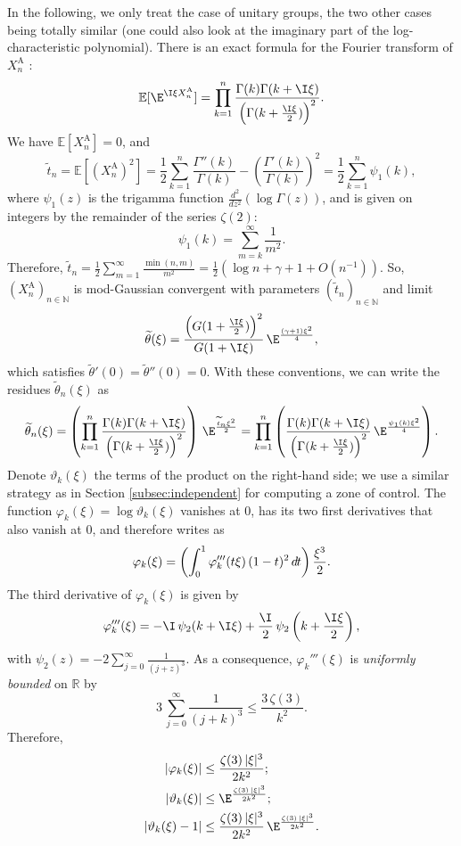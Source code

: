 \documentclass[envcountsame]{svmult}
\newcommand{\N}{\mathbb{N}}
\newcommand{\R}{\mathbb{R}}
\newcommand{\esper}{\mathbb{E}}
\newcommand{\DD}[1]{\,d\hspace*{-0.3mm}{#1}}
\begin{document}
In the following, we only treat the case of unitary groups, the two other cases being totally similar (one could also look at the imaginary part of the log-characteristic polynomial). There is an exact formula for the Fourier transform of $X_n^\mathrm{A}$ \cite[Formula (71)]{KS2000}:
$$\esper[\E^{\I \xi X_n^{\mathrm{A}}}] = \prod_{k=1}^n \frac{\Gamma(k)\Gamma(k+\I \xi)}{\left(\Gamma(k+\frac{\I\xi}{2})\right)^2}.$$
We have $\esper[X_n^{\mathrm{A}}]=0$, and 
$$\widetilde{t}_n=\esper[(X_n^{\mathrm{A}})^2]=\frac{1}{2}\sum_{k=1}^n \frac{\Gamma''(k)}{\Gamma(k)} - \left(\frac{\Gamma'(k)}{\Gamma(k)}\right)^2 = \frac{1}{2}\sum_{k=1}^n \psi_1(k),$$
where $\psi_1(z)$ is the trigamma function $\frac{d^2}{dz^2}(\log\Gamma(z))$, and is given on integers by the remainder of the series $\zeta(2)$:
$$\psi_1(k) = \sum_{m=k}^\infty \frac{1}{m^2}.$$
Therefore, $\widetilde{t}_n = \frac{1}{2}\sum_{m=1}^\infty \frac{\min(n,m)}{m^2} = \frac{1}{2}(\log n + \gamma + 1 + O(n^{-1}))$. So, $(X_n^\mathrm{A})_{n \in \N}$ is mod-Gaussian convergent with parameters $(\widetilde{t}_n)_{n \in \N}$ and limit
$$\widetilde{\theta}(\xi) = \frac{\left(G(1+\frac{\I \xi}{2})\right)^2}{G(1+\I \xi)}\,\E^{\frac{(\gamma+1)\xi^2}{4}},$$
which satisfies $\widetilde{\theta}'(0)=\widetilde{\theta}''(0)=0$. With these conventions, we can write the residues $\widetilde{\theta}_n(\xi)$ as
$$\widetilde{\theta}_n(\xi)= \left(\prod_{k=1}^n \frac{\Gamma(k)\Gamma(k+\I \xi)}{\left(\Gamma(k+\frac{\I\xi}{2})\right)^2}\right)\,\E^{\frac{\widetilde{t}_n\xi^2}{2}} = \prod_{k=1}^n \left(\frac{\Gamma(k)\Gamma(k+\I \xi)}{\left(\Gamma(k+\frac{\I\xi}{2})\right)^2}\,\E^{\frac{\psi_1(k)\xi^2}{4}}\right).$$
Denote $\vartheta_k(\xi)$ the terms of the product on the right-hand side; we use a similar strategy as in Section \ref{subsec:independent} for computing a zone of control. The function $\varphi_k(\xi) = \log \vartheta_k(\xi)$ vanishes at $0$, has its two first derivatives that also vanish at $0$, and therefore writes as
$$\varphi_k(\xi) = \left(\int_0^1 \varphi_k'''(t\xi)\, (1-t)^2\DD{t}\right)\frac{\xi^3}{2}.$$
The third derivative of $\varphi_k(\xi)$ is given by
$$\varphi_k'''(\xi) = -\I \,\psi_2(k+\I\xi) + \frac{\I}{2}\,\psi_2\left(k+\frac{\I\xi}{2}\right),$$
with $\psi_2(z) = -2\sum_{j=0}^\infty \frac{1}{(j+z)^3}$. As a consequence, $\varphi_k'''(\xi)$ is \emph{uniformly bounded} on $\R$ by
$$3\,\sum_{j=0}^\infty \frac{1}{(j+k)^3} \leq \frac{3\,\zeta(3)}{k^2}.$$
Therefore, 
\begin{align*}
|\varphi_k(\xi)| &\leq \frac{\zeta(3)\, |\xi|^3}{2k^2};\\
|\vartheta_k(\xi)| &\leq \E^{\frac{\zeta(3)\, |\xi|^3}{2k^2}};\\
|\vartheta_k(\xi)-1| &\leq \frac{\zeta(3)\, |\xi|^3}{2k^2}\,\E^{\frac{\zeta(3)\, |\xi|^3}{2k^2}}.
\end{align*}
\end{document}
